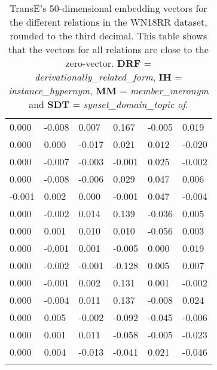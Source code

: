 \begin{longtable}{llllll}
0.000        & -0.008             & 0.007             & 0.167       & -0.005      & 0.019        \\
0.000        & 0.000              & -0.017            & 0.021       & 0.012       & -0.020       \\
0.000        & -0.007             & -0.003            & -0.001      & 0.025       & -0.002       \\
0.000        & -0.008             & -0.006            & 0.029       & 0.047       & 0.006        \\
-0.001       & 0.002              & 0.000             & -0.001      & 0.047       & -0.004       \\
0.000        & -0.002             & 0.014             & 0.139       & -0.036      & 0.005        \\
0.000        & 0.001              & 0.010             & 0.010       & -0.056      & 0.003        \\
0.000        & -0.001             & 0.001             & -0.005      & 0.000       & 0.019        \\
0.000        & -0.002             & -0.001            & -0.128      & 0.005       & 0.007        \\
0.000        & -0.001             & 0.002             & 0.131       & 0.001       & -0.002       \\
0.000        & -0.004             & 0.011             & 0.137       & -0.008      & 0.024        \\
0.000        & 0.005              & -0.002            & -0.092      & -0.045      & -0.006       \\
0.000        & 0.001              & 0.011             & -0.058      & -0.005      & -0.023       \\
0.000        & 0.004              & -0.013            & -0.041      & 0.021       & -0.046      \\ \hline
\caption[TransE embedding vector WN18RR KG]{TransE's 50-dimensional embedding vectors for the different relations in the WN18RR dataset, rounded to the third decimal. This table shows that the vectors for all relations are close to the zero-vector. \textbf{DRF} = \textit{derivationally\_related\_form}, \textbf{IH} = \textit{instance\_hypernym}, \textbf{MM} = \textit{member\_meronym} and \textbf{SDT} = \textit{synset\_domain\_topic of}.}
\label{TransE_embedding_WN18RR}
\end{longtable}


